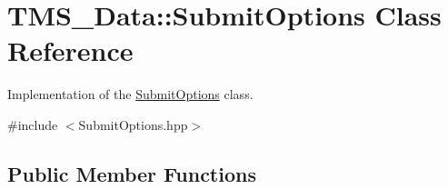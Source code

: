\hypertarget{classTMS__Data_1_1SubmitOptions}{
\section{TMS\_\-Data::SubmitOptions Class Reference}
\label{classTMS__Data_1_1SubmitOptions}
}


Implementation of the \hyperlink{classTMS__Data_1_1SubmitOptions}{SubmitOptions} class.  




{\ttfamily \#include $<$SubmitOptions.hpp$>$}

\subsection*{Public Member Functions}
